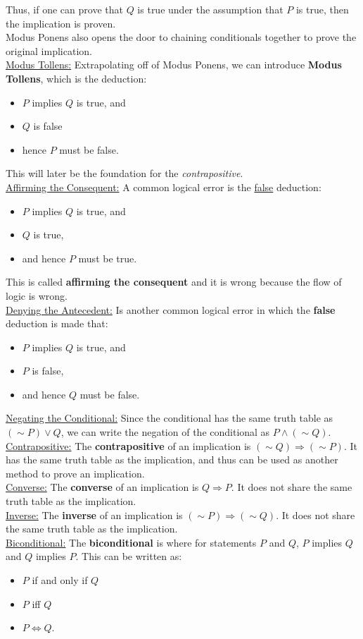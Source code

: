 \documentclass{article}
\newcommand{\gap}{\medskip\\}
\newcommand{\sheader}[1]{\underline{#1:}}
\newcommand{\sgap}{\smallskip\\}
\begin{document}
Thus, if one can prove that $Q$ is true under the assumption that $P$ is true, then the 
implication is proven. 
\sgap
Modus Ponens also opens the door to chaining conditionals together to prove the original implication.
\gap
\sheader{Modus Tollens} Extrapolating off of Modus Ponens, we can introduce \textbf{Modus Tollens},
which is the deduction:
\begin{itemize}
    \item $P$ implies $Q$ is true, and
    \item $Q$ is false
    \item hence $P$ must be false.
\end{itemize}
This will later be the foundation for the \textit{contrapositive}.
\gap
\sheader{Affirming the Consequent} A common logical error is the \underline{false}
deduction:
\begin{itemize}
    \item $P$ implies $Q$ is true, and
    \item $Q$ is true,
    \item and hence $P$ must be true.
\end{itemize}
This is called \textbf{affirming the consequent} and it is wrong because the flow of logic
is wrong.
\gap
\sheader{Denying the Antecedent} Is another common logical error in which the \textbf{false}
deduction is made that:
\begin{itemize}
    \item $P$ implies $Q$ is true, and
    \item $P$ is false,
    \item and hence $Q$ must be false.
\end{itemize}
\sheader{Negating the Conditional} Since the conditional has the same truth table as
$(\sim P) \vee Q$, we can write the negation of the conditional as $P \wedge (\sim Q)$.
\gap
\sheader{Contrapositive} The \textbf{contrapositive} of an implication is $(\sim Q) \Rightarrow (\sim P)$.
It has the same truth table as the implication, and thus can be used as another method
to prove an implication.
\gap
\sheader{Converse} The \textbf{converse} of an implication is $Q \Rightarrow P$. 
It does not share the same truth table as the implication.
\gap
\sheader{Inverse} The \textbf{inverse} of an implication is $(\sim P) \Rightarrow (\sim Q)$.
It does not share the same truth table as the implication.
\gap
\sheader{Biconditional} The \textbf{biconditional} is where for statements $P$ and $Q$,
$P$ implies $Q$ and $Q$ implies $P$. This can be written as:
\begin{itemize}
    \item $P$ if and only if $Q$
    \item $P$ iff $Q$
    \item $P \Longleftrightarrow Q$.
\end{itemize}
\end{document}
